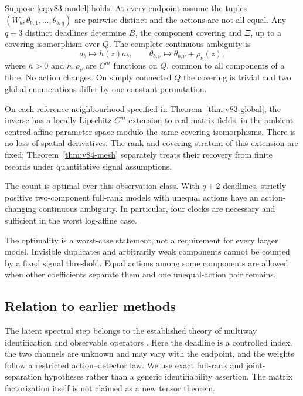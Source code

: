 \begin{theorem}\label{thm:v83-main}
Suppose \eqref{eq:v83-model} holds. At every endpoint assume the tuples
$(W_b,\theta_{b,1},\ldots,\theta_{b,q})$ are pairwise distinct and the
actions are not all equal. Any $q+3$ distinct deadlines determine $B$,
the component covering and $\Xi$, up to a covering isomorphism over $Q$.
The complete continuous ambiguity is
\begin{equation}\label{eq:v83-gauge}
 a_b\mapsto h(z)a_b,\qquad
 \theta_{b,\nu}\mapsto\theta_{b,\nu}+\rho_\nu(z),
\end{equation}
where $h>0$ and $h,\rho_\nu$ are $C^m$ functions on $Q$, common to all
components of a fibre. No action changes. On simply connected $Q$ the
covering is trivial and two global enumerations differ by one constant
permutation.

On each reference neighbourhood specified in
Theorem~\ref{thm:v83-global}, the inverse has a locally Lipschitz
$C^m$ extension to real matrix fields, in the ambient centred affine
parameter space modulo the same covering isomorphisms. There is no
loss of spatial derivatives. The rank and covering stratum of this
extension are fixed; Theorem~\ref{thm:v84-mesh} separately treats their
recovery from finite records under quantitative signal assumptions.

The count is optimal over this observation class. With $q+2$ deadlines,
strictly positive two-component full-rank models with unequal actions
have an action-changing continuous ambiguity. In particular, four
clocks are necessary and sufficient in the worst log-affine case.
\end{theorem}
The optimality is a worst-case statement, not a requirement for every
larger model. Invisible duplicates and arbitrarily weak components
cannot be counted by a fixed signal threshold. Equal actions among
some components are allowed when other coefficients separate them and
one unequal-action pair remains.

\subsection{Relation to earlier methods}
The latent spectral step belongs to the established theory of
multiway identification and observable operators
\cite{V83AMR,V83AHK,V83BJR}. Here the deadline is a controlled index,
the two channels are unknown and may vary with the endpoint, and the
weights follow a restricted action--detector law. We use exact
full-rank and joint-separation hypotheses rather than a generic
identifiability assertion. The matrix factorization itself is not
claimed as a new tensor theorem.

